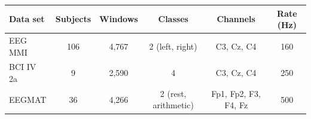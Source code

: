 \begin{tabular}{@{}lccccc@{}}
\toprule
Data set & Subjects & Windows & Classes & Channels & Rate (Hz) \\
\midrule
EEG MMI & 106 & 4,767 & 2 (left, right) & C3, Cz, C4 & 160 \\
BCI IV 2a & 9 & 2,590 & 4 & C3, Cz, C4 & 250 \\
EEGMAT & 36 & 4,266 & 2 (rest, arithmetic) & Fp1, Fp2, F3, F4, Fz & 500 \\
\bottomrule
\end{tabular}
